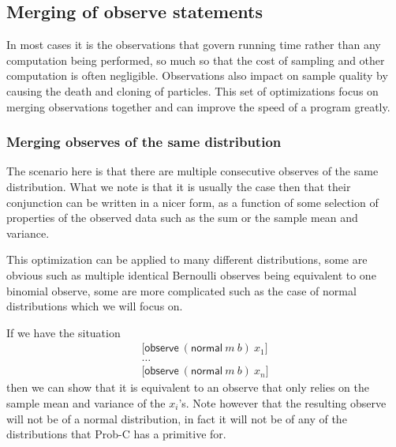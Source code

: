 \documentclass[a4paper]{article}
\begin{document}

\subsection{Merging of observe statements}

In most cases it is the observations that govern running time rather than any computation being performed, so much so that the cost of sampling and other computation is often negligible. Observations also impact on sample quality by causing the death and cloning of particles. This set of optimizations focus on merging observations together and can improve the speed of a program greatly.




\subsubsection{Merging observes of the same distribution}

The scenario here is that there are multiple consecutive observes of the same distribution. What we note is that it is usually the case then that their conjunction can be written in a nicer form, as a function of some selection of properties of the observed data such as the sum or the sample mean and variance.

This optimization can be applied to many different distributions, some are obvious such as multiple identical Bernoulli observes being equivalent to one binomial observe, some are more complicated such as the case of normal distributions which we will focus on.

If we have the situation
\[
	\begin{array}{l}
		\lbrack \mathsf{observe}\ (\mathsf{normal}\ m\ b)\ x_1 \rbrack \\
		\dots \\
		\lbrack \mathsf{observe}\ (\mathsf{normal}\ m\ b)\ x_n \rbrack
	\end{array}
\]
then we can show that it is equivalent to an observe that only relies on the sample mean and variance of the \(x_i\)'s. Note however that the resulting observe will not be of a normal distribution, in fact it will not be of any of the distributions that Prob-C has a primitive for.
\end{document}

